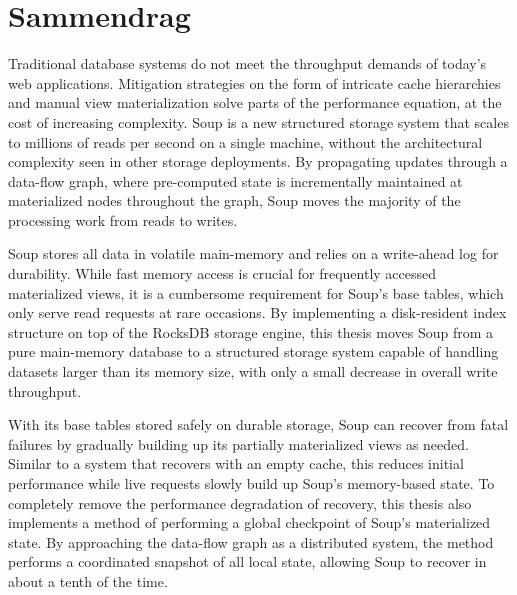 \section*{Sammendrag}

Traditional database systems do not meet the throughput demands of today's web
applications. Mitigation strategies on the form of intricate cache hierarchies
and manual view materialization solve parts of the performance equation, at the
cost of increasing complexity. Soup is a new structured storage system that
scales to millions of reads per second on a single machine, without the
architectural complexity seen in other storage deployments. By propagating
updates through a data-flow graph, where pre-computed state is incrementally
maintained at materialized nodes throughout the graph, Soup moves the majority
of the processing work from reads to writes.

Soup stores all data in volatile main-memory and relies on a write-ahead log for
durability. While fast memory access is crucial for frequently accessed
materialized views, it is a cumbersome requirement for Soup's base tables, which
only serve read requests at rare occasions. By implementing a disk-resident
index structure on top of the RocksDB storage engine, this thesis moves Soup
from a pure main-memory database to a structured storage system capable of
handling datasets larger than its memory size, with only a small decrease in
overall write throughput.

With its base tables stored safely on durable storage, Soup can recover from
fatal failures by gradually building up its partially materialized views as
needed. Similar to a system that recovers with an empty cache, this reduces
initial performance while live requests slowly build up Soup's memory-based
state. To completely remove the performance degradation of recovery, this thesis
also implements a method of performing a global checkpoint of Soup's
materialized state. By approaching the data-flow graph as a distributed system,
the method performs a coordinated snapshot of all local state, allowing Soup to
recover in about a tenth of the time.

\newpage
